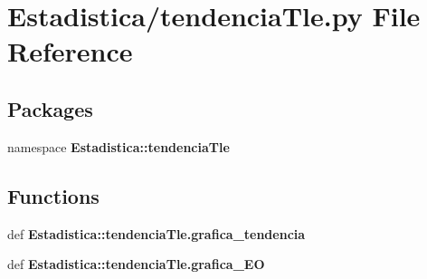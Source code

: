 \section{\-Estadistica/tendencia\-Tle.py \-File \-Reference}
\label{tendencia_tle_8py}
\subsection*{\-Packages}
\begin{DoxyCompactItemize}
\item 
namespace {\bf \-Estadistica\-::tendencia\-Tle}
\end{DoxyCompactItemize}
\subsection*{\-Functions}
\begin{DoxyCompactItemize}
\item 
def {\bf \-Estadistica\-::tendencia\-Tle.\-grafica\-\_\-tendencia}
\item 
def {\bf \-Estadistica\-::tendencia\-Tle.\-grafica\-\_\-\-E\-O}
\end{DoxyCompactItemize}
